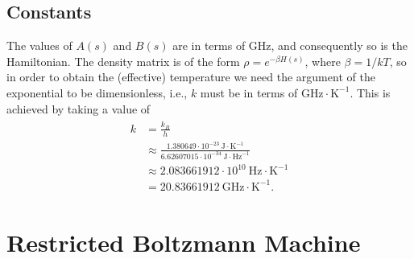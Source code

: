 \section{Constants}\label{app:constants}
The values of \( A(s) \) and \( B(s) \) are in terms of \si{\giga\hertz}, and consequently so is the Hamiltonian.
The density matrix is of the form \( \rho = e^{-\beta H(s)} \), where \( \beta = 1 / kT \), so in order to obtain the (effective) temperature we need the argument of the exponential to be dimensionless, i.e., \( k \) must be in terms of \( \si{\giga\hertz} \cdot \si{\kelvin}^{-1} \).
This is achieved by taking a value of
\begin{align}
\begin{split}
    k
        &= \frac{k_B}{h} \\
        &\approx \frac{1.380649 \cdot 10^{-23} \ \si{\joule} \cdot \si{\kelvin}^{-1}}{6.62607015 \cdot 10^{-34} \ \si{\joule} \cdot \si{\hertz}^{-1}} \\
        &\approx 2.083661912 \cdot 10^{10} \ \si{\hertz} \cdot \si{\kelvin}^{-1} \\
        &= 20.83661912 \ \si{\giga\hertz} \cdot \si{\kelvin}^{-1}.
\end{split}
\end{align}

\chapter{Restricted Boltzmann Machine}
